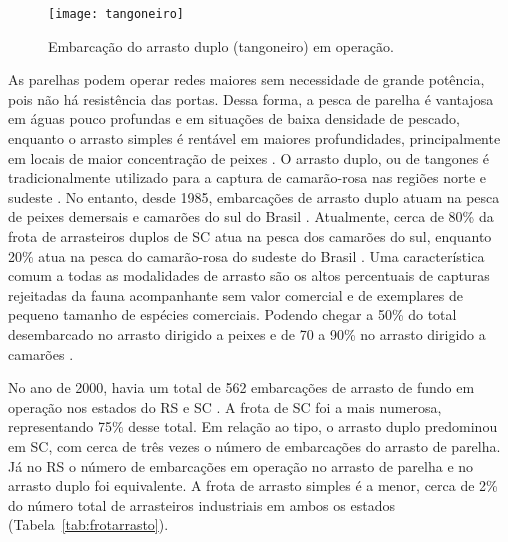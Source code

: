 \documentclass[a4paper,11pt,twoside,showtrims,onecolumn,openright,final]{memoir}
\begin{document}
\begin{figure}
\begin{center}
\texttt{[image: tangoneiro]}
\end{center}
\caption[Embarcação do arrasto duplo em operação]
        {Embarcação do arrasto duplo (tangoneiro) em operação.}
\label{fig:tangoneiro}
\end{figure}


As parelhas podem operar redes maiores sem necessidade de grande potência, pois não há resistência 
das portas. Dessa forma, a pesca de parelha é vantajosa em águas pouco profundas e em situações 
de baixa densidade de pescado, enquanto o arrasto simples é rentável em maiores profundidades,
principalmente em locais de maior concentração de peixes \citep{BARCELLOS1991}. O arrasto duplo, 
ou de tangones é tradicionalmente utilizado para a captura de camarão-rosa nas regiões norte e 
sudeste \citep{ueno1980}. No entanto, desde 1985, embarcações de arrasto duplo atuam 
na pesca de peixes demersais e camarões do sul do Brasil \citep{BARCELLOS1991}. Atualmente, cerca 
de 80\% da frota de arrasteiros duplos de SC atua na pesca dos camarões do sul, 
enquanto 20\% atua na pesca do camarão-rosa do sudeste do Brasil \citep{perez2001a}. 
Uma característica comum a todas 
as modalidades de arrasto são os altos percentuais de capturas rejeitadas da fauna acompanhante 
sem valor comercial e de exemplares de pequeno tamanho de espécies comerciais. Podendo chegar 
a 50\% do total desembarcado no arrasto dirigido a peixes e de 70 a 90\% 
no arrasto dirigido a camarões \citep{haimovici1981,haimovici1996d,kotas1998,perez2001a}.



No ano de 2000, havia um total de 562 embarcações de arrasto de fundo em operação nos 
estados do RS e SC \citep{perez2001a}. A frota de SC foi a mais numerosa, representando 75\% 
desse total. Em relação ao tipo, o arrasto duplo predominou em SC, com cerca de três vezes o 
número de embarcações do arrasto de parelha. Já no RS o número de embarcações em operação 
no arrasto de parelha e no arrasto duplo foi equivalente. A frota de arrasto simples é a 
menor, cerca de 2\% do número total de arrasteiros industriais em ambos 
os estados (Tabela~\ref{tab:frotarrasto}). 
\end{document}
